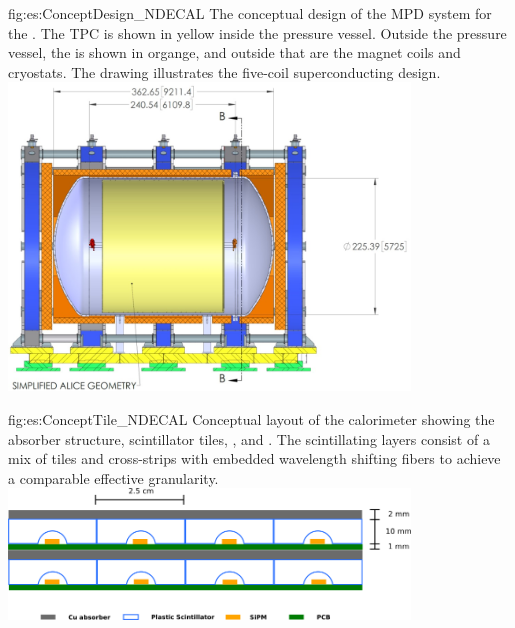 \begin{dunefigure}{fig:es:ConceptDesign_NDECAL}
{The conceptual design of the MPD system for the . The TPC is shown in yellow inside the pressure vessel.  Outside the pressure vessel, the  is shown in organge, and outside that are the magnet coils and cryostats.  The drawing illustrates the five-coil superconducting design.}
\includegraphics[width=0.8\textwidth]{graphics/MPDdrawing.jpg}
\end{dunefigure}

\begin{dunefigure}{fig:es:ConceptTile_NDECAL}
{Conceptual layout of the calorimeter showing the absorber structure, scintillator tiles, , and . The scintillating layers consist of a mix of tiles and cross-strips with embedded wavelength shifting fibers to achieve a comparable effective granularity.}
\includegraphics[width=0.8\textwidth]{graphics/TileConcept.png}
\end{dunefigure}

